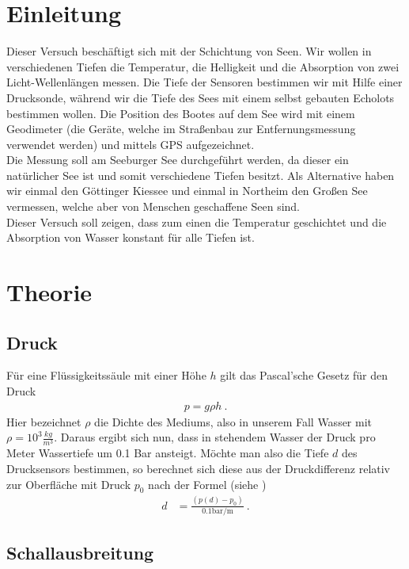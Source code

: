 \documentclass[12pt,a4paper,titlepage,headinclude,bibtotoc]{scrartcl}
\numberwithin{equation}{subsection}
\begin{document}
\setcounter{footnote}{0}
\setcounter{page}{1}

\section{Einleitung}
\label{sec:einleitung}
Dieser Versuch beschäftigt sich mit der Schichtung von Seen.
Wir wollen in verschiedenen Tiefen die Temperatur, die Helligkeit und die Absorption von zwei Licht-Wellenlängen messen.
Die Tiefe der Sensoren bestimmen wir mit Hilfe einer Drucksonde, während wir die Tiefe des Sees mit einem selbst gebauten Echolots bestimmen wollen.
Die Position des Bootes auf dem See wird mit einem Geodimeter (die Geräte, welche im Straßenbau zur Entfernungsmessung verwendet werden) und mittels GPS aufgezeichnet.\\
Die Messung soll am Seeburger See durchgeführt werden, da dieser ein natürlicher See ist und somit verschiedene Tiefen besitzt.
Als Alternative haben wir einmal den Göttinger Kiessee und einmal in Northeim den Großen See vermessen, welche aber von Menschen geschaffene Seen sind. \\
Dieser Versuch soll zeigen, dass zum einen die Temperatur geschichtet und die Absorption von Wasser konstant für alle Tiefen ist.


\section{Theorie}
\label{sec:theorie}
\subsection{Druck}

Für eine Flüssigkeitssäule mit einer Höhe $h$ gilt das Pascal'sche Gesetz für den Druck
\begin{align}
 p= g \rho h~.
\end{align}
Hier bezeichnet $\rho$ die Dichte des Mediums, also in unserem Fall Wasser mit $\rho = 10^3 \frac{kg}{m^3}$. Daraus ergibt sich nun, dass in stehendem Wasser der Druck pro Meter Wassertiefe um 0.1 Bar ansteigt.
Möchte man also die Tiefe $d$ des Drucksensors bestimmen, so berechnet sich diese aus der Druckdifferenz relativ zur Oberfläche mit Druck $p_0$ nach der Formel (siehe \cite[S.118]{gerthsen})
\begin{align}
	d&=\frac{(p(d)-p_0)}{0.1\si{\bar \per\metre}}~. \label{eq:d}
\end{align}

\subsection{Schallausbreitung}
\end{document}
